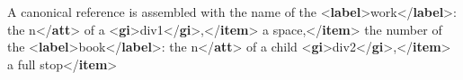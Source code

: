 \begin{shaded}
\hspace*{1em}\hspace*{1em}A canonical reference is assembled with\mbox{}\newline 
\hspace*{1em}\hspace*{1em}\mbox{}\newline 
\hspace*{1em}\hspace*{1em}\hspace*{1em}\hspace*{1em}the name of the {<\textbf{label}>}work{</\textbf{label}>}: the\mbox{}\newline 
\hspace*{1em}\hspace*{1em}\hspace*{1em}\hspace*{1em}n{</\textbf{att}>} of a {<\textbf{gi}>}div1{</\textbf{gi}>},{</\textbf{item}>}\mbox{}\newline 
\hspace*{1em}\hspace*{1em}\hspace*{1em}\hspace*{1em}a space,{</\textbf{item}>}\mbox{}\newline 
\hspace*{1em}\hspace*{1em}\hspace*{1em}\hspace*{1em}the number of the {<\textbf{label}>}book{</\textbf{label}>}: the\mbox{}\newline 
\hspace*{1em}\hspace*{1em}\hspace*{1em}\hspace*{1em}n{</\textbf{att}>} of a child {<\textbf{gi}>}div2{</\textbf{gi}>},{</\textbf{item}>}\mbox{}\newline 
\hspace*{1em}\hspace*{1em}\hspace*{1em}\hspace*{1em}a full stop{</\textbf{item}>}\mbox{}\newline 

\end{shaded}
